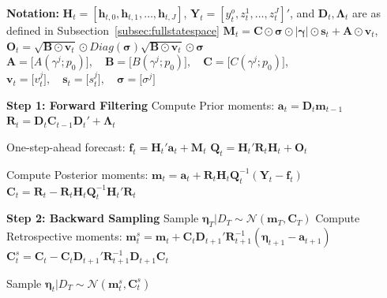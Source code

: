 \documentclass[APA,STIX1COL]{WileyNJD-v2}
\begin{document}
\begin{algorithm}
\caption{MCMC - Forward Filtering Backward Sampling (FFBS)}
\label{alg:Alg2}
\begin{algorithmic}

\State \textbf{Notation:}
\State  $\mathbf{H}_t = [\mathbf{h}_{t,0}, \mathbf{h}_{t,1}, \ldots, \mathbf{h}_{t,J}]$, $\mathbf{Y}_t = [y_t^o, z_t^1, \ldots, z_t^J]'$, and $\mathbf{D}_t, \boldsymbol{\Lambda}_t$ are as defined in Subsection~\ref{subsec:fullstatespace}
\State $\mathbf{M}_t= \mathbf{C} \odot  \mathbf{\sigma} \odot | \mathbf{\gamma} | \odot \mathbf{s}_t + \mathbf{A} \odot \mathbf{v}_t$, \quad $\mathbf{O}_t= \sqrt{\mathbf{B} \odot \mathbf{v}_t} \odot Diag
(\mathbf{\sigma}) \sqrt{\mathbf{B} \odot \mathbf{v}_t} \odot \mathbf{\sigma}$
\State  \(
\mathbf{A} = \big[ A(\gamma^j;p_0)   \big], \quad \mathbf{B} = \big[  B(\gamma^j;p_0)  \big], \quad \mathbf{C} = \big[ C(\gamma^j;p_0)   \big] \), 
\State \( \mathbf{v}_t = \big[  v^j_t   \big], \quad  \mathbf{s}_t = \big[ 
s^j_t  \big] , \quad \mathbf{\sigma} = \big[ \sigma^j  \big]
\)
\State {} \odot {}
\vspace{0.1cm}
\hline
\vspace{0.1cm}

\State \textbf{Step 1: Forward Filtering}
    \State Compute Prior moments:
    \State $\mathbf{a}_t = \mathbf{D}_t \mathbf{m}_{t-1}$
    \State $\mathbf{R}_t = \mathbf{D}_t \mathbf{C}_{t-1} \mathbf{D}_t' +  \boldsymbol{\Lambda}_t$

    \State One-step-ahead forecast:
    \State $\mathbf{f}_t = \mathbf{H}_t' \mathbf{a}_t + \mathbf{M}_t$
    \State $\mathbf{Q}_t = \mathbf{H}_t' \mathbf{R}_t \mathbf{H}_t + \mathbf{O}_t$
    
    \State Compute Posterior moments:
    \State $\mathbf{m}_t = \mathbf{a}_t + \mathbf{R}_t \mathbf{H}_t \mathbf{Q}_t^{-1}(\mathbf{Y}_t - \mathbf{f}_t)$
    \State $\mathbf{C}_t = \mathbf{R}_t - \mathbf{R}_t \mathbf{H}_t \mathbf{Q}_t^{-1} \mathbf{H}_t' \mathbf{R}_t$
\EndFor

\State \textbf{Step 2: Backward Sampling}
        \State Sample $\boldsymbol{\eta}_T | D_T \sim \mathcal{N}(\mathbf{m}_T, \mathbf{C}_T)$
    \Else
        \State Compute Retrospective moments:
        \State $\mathbf{m}_t^s = \mathbf{m}_t + \mathbf{C}_t \mathbf{D}_{t+1}' \mathbf{R}_{t+1}^{-1} (\boldsymbol{\eta}_{t+1} - \mathbf{a}_{t+1})$
        \State $\mathbf{C}_t^s = \mathbf{C}_t - \mathbf{C}_t \mathbf{D}_{t+1}' \mathbf{R}_{t+1}^{-1} \mathbf{D}_{t+1} \mathbf{C}_t$
        
        \State Sample $\boldsymbol{\eta}_t | D_T \sim \mathcal{N}(\mathbf{m}_t^s, \mathbf{C}_t^s)$
    \EndIf
\EndFor

\end{algorithmic}
\end{algorithm}
\end{document}
